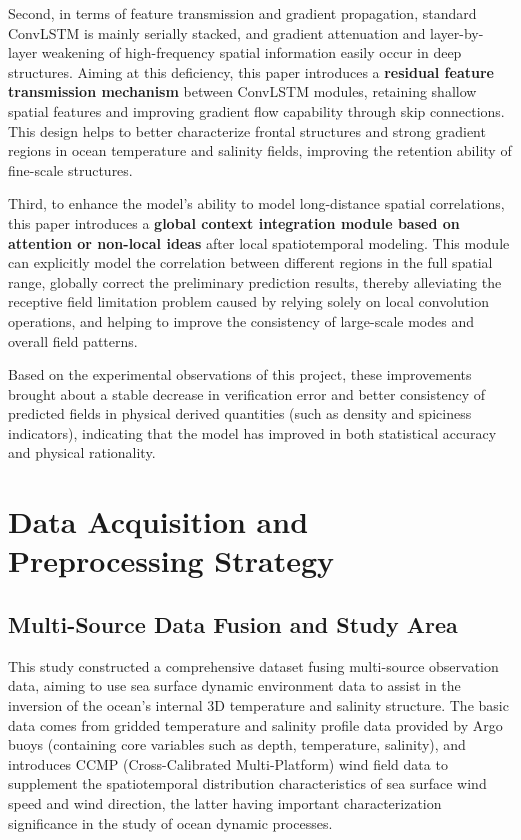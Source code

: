 \documentclass[webpdf,contemporary,large]{oup-authoring-template}
\begin{document}
Second, in terms of feature transmission and gradient propagation, standard ConvLSTM is mainly serially stacked, and gradient attenuation and layer-by-layer weakening of high-frequency spatial information easily occur in deep structures. Aiming at this deficiency, this paper introduces a \textbf{residual feature transmission mechanism} between ConvLSTM modules, retaining shallow spatial features and improving gradient flow capability through skip connections. This design helps to better characterize frontal structures and strong gradient regions in ocean temperature and salinity fields, improving the retention ability of fine-scale structures.

Third, to enhance the model's ability to model long-distance spatial correlations, this paper introduces a \textbf{global context integration module based on attention or non-local ideas} after local spatiotemporal modeling. This module can explicitly model the correlation between different regions in the full spatial range, globally correct the preliminary prediction results, thereby alleviating the receptive field limitation problem caused by relying solely on local convolution operations, and helping to improve the consistency of large-scale modes and overall field patterns.

Based on the experimental observations of this project, these improvements brought about a stable decrease in verification error and better consistency of predicted fields in physical derived quantities (such as density and spiciness indicators), indicating that the model has improved in both statistical accuracy and physical rationality.

\section{Data Acquisition and Preprocessing Strategy}

\subsection{Multi-Source Data Fusion and Study Area}

This study constructed a comprehensive dataset fusing multi-source observation data, aiming to use sea surface dynamic environment data to assist in the inversion of the ocean's internal 3D temperature and salinity structure. The basic data comes from gridded temperature and salinity profile data provided by Argo buoys (containing core variables such as depth, temperature, salinity), and introduces CCMP (Cross-Calibrated Multi-Platform) wind field data to supplement the spatiotemporal distribution characteristics of sea surface wind speed and wind direction, the latter having important characterization significance in the study of ocean dynamic processes.
\end{document}

